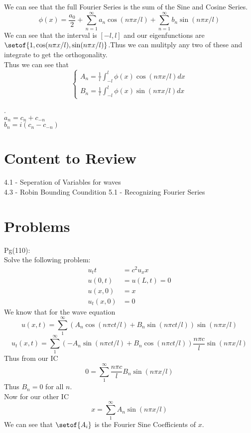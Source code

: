 \documentclass[answers,12pt,addpoints]{exam}
\begin{document}
\begin{definition}
    We can see that the full Fourier Series is the sum of the Sine and Cosine Series.
    $$ \phi(x) = \frac{a_0}{2} + \sum_{n=1}^\infty a_n \cos(n\pi x/l) + \sum_{n=1}^\infty b_n \sin(n\pi x/l)$$
    We can see that the interval is $[-l,l]$ and our eigenfunctions are $\setof{1, \cos(n\pi x/l), \sin(n\pi x/l)}$.Thus we can mulitply any two of these and integrate to get the orthogonality.\\
    Thus we can see that 
    $$ \begin{cases}
        A_n = \frac{1}{l} \int_{-l}^l \phi(x) \cos(n\pi x/l) dx\\
        B_n = \frac{1}{l} \int_{-l}^l \phi(x) \sin(n\pi x/l) dx
    \end{cases}$$
\end{definition}
\begin{definition}[$c_n, a_n, b_n$]
   .\\
    $a_n = c_n + c_{-n}$\\
    $b_n = i(c_n - c_{-n})$
\end{definition}


\newpage
\section{Content to Review}
4.1 - Seperation of Variables for waves\\
4.3 - Robin Bounding Coundition
5.1 - Recognizing Fourier Series

\newpage
\section{Problems}
\begin{questions}
    \question Pg(110): \\
    Solve the following problem:
    \begin{align*}
        u_tt &= c^2 u_xx \\
        u(0,t) &= u(L,t) = 0 \\
        u(x,0) &= x \\
        u_t(x,0) &= 0
    \end{align*}
    We know that for the wave equation \\
    $$u(x,t) = \sum_1^\infty (A_n \cos(n\pi ct/l) + B_n \sin(n\pi ct/l)) \sin(n\pi x/l)$$
    $$ u_t(x,t) = \sum_1^\infty (-A_n \sin(n\pi ct/l) + B_n \cos(n\pi ct/l)) \frac{n\pi c}{l} \sin(n\pi x/l)$$
    Thus from our IC
    $$ 0 = \sum_1^\infty \frac{n\pi c}{l} B_n \sin(n\pi x/l)$$
    Thus $B_n = 0$ for all $n$.\\
    Now for our other IC
    $$ x = \sum_1^\infty A_n \sin(n\pi x/l)$$
    We can see that $\setof{A_i}$ is the Fourier Sine Coefficients of $x$.\\





\end{questions}
\end{document}
